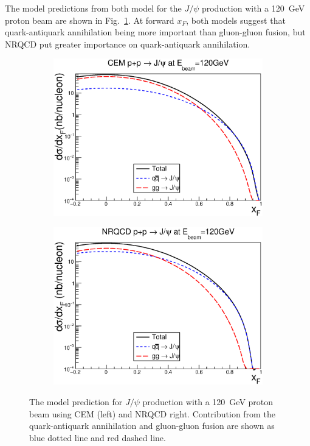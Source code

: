 \documentclass[10pt, a4paper,final]{article}
\begin{document}
The model predictions from both model for the $J/\psi$ production with a \SI{120}{\GeV}
proton beam are shown in Fig.~\ref{fig:jpsi_theory}. At forward $x_F$, both models suggest
that quark-antiquark annihilation being more important than gluon-gluon fusion, but NRQCD
put greater importance on quark-antiquark annihilation.
\begin{figure}[htbp!]
	\centering
	\begin{subfigure}{0.45\linewidth}
		\includegraphics[width=0.9\linewidth]{pp_norm_cs_NLO_pp}
	\end{subfigure}
	\begin{subfigure}{0.45\linewidth}
		\includegraphics[width=0.9\linewidth]{jpsi_cs_pp}
	\end{subfigure}
	\caption{The model prediction for $J/\psi$ production with a \SI{120}{\GeV}
		proton beam using CEM (left) and NRQCD {right}. Contribution from the
		quark-antiquark annihilation and gluon-gluon fusion are shown as blue dotted line
		and red dashed line.}
	\label{fig:jpsi_theory}
\end{figure}
\end{document}
